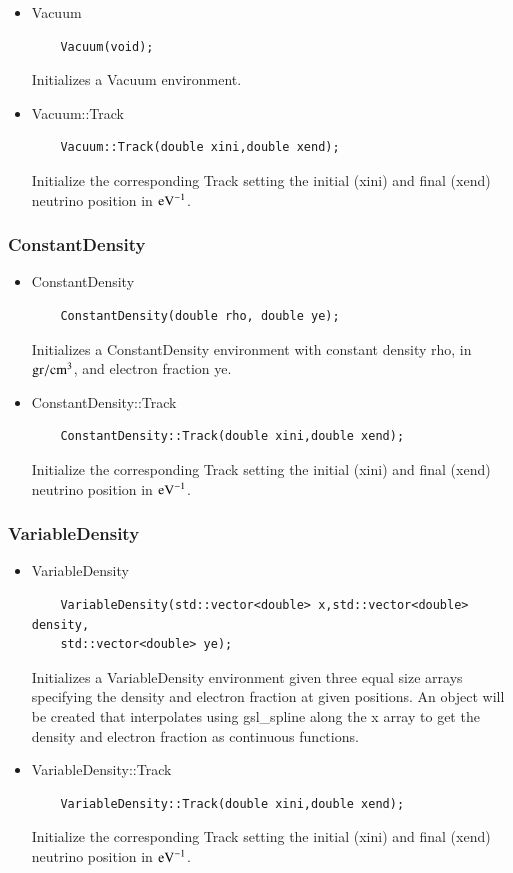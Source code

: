 \documentclass[3p,12pt,authoryear]{elsarticle}
\newcommand{\ttf}{\ttfamily}
\begin{document}
\begin{itemize}
\item {\ttf Vacuum}
  \begin{lstlisting}
    Vacuum(void);
  \end{lstlisting}
  Initializes a {\ttf Vacuum} environment. 
\item {\ttf Vacuum::Track}
  \begin{lstlisting}
    Vacuum::Track(double xini,double xend);
  \end{lstlisting}
  Initialize the corresponding {\ttf Track} setting the initial ({\ttf xini}) and final ({\ttf xend}) neutrino position in ${\rm eV}^{-1}$.
\end{itemize}

\subsubsection{{\ttf ConstantDensity}}

\begin{itemize}
\item {\ttf ConstantDensity}
  \begin{lstlisting}
    ConstantDensity(double rho, double ye);
  \end{lstlisting}
  Initializes a {\ttf ConstantDensity} environment with constant density {\ttf rho}, in ${\rm gr}/{\rm cm}^3$, and electron fraction {\ttf ye}.
\item {\ttf ConstantDensity::Track}
  \begin{lstlisting}
    ConstantDensity::Track(double xini,double xend);
  \end{lstlisting}
  Initialize the corresponding {\ttf Track} setting the initial ({\ttf xini}) and final ({\ttf xend}) neutrino position in ${\rm eV}^{-1}$.
\end{itemize}

\subsubsection{{\ttf VariableDensity}}

\begin{itemize}
\item {\ttf VariableDensity}
  \begin{lstlisting}
    VariableDensity(std::vector<double> x,std::vector<double> density,
    std::vector<double> ye);
  \end{lstlisting}
  Initializes a {\ttf VariableDensity} environment given three equal size arrays specifying the density and electron fraction at given positions. An object will be created that interpolates using {\ttfamily gsl\_spline} \citep{gough2009gnu} along the {\ttf x} array to get the density and electron fraction as continuous functions.
  \item {\ttf VariableDensity::Track}
  \begin{lstlisting}
    VariableDensity::Track(double xini,double xend);
  \end{lstlisting}
  Initialize the corresponding {\ttf Track} setting the initial ({\ttf xini}) and final ({\ttf xend}) neutrino position in ${\rm eV}^{-1}$.
\end{itemize}
\end{document}
